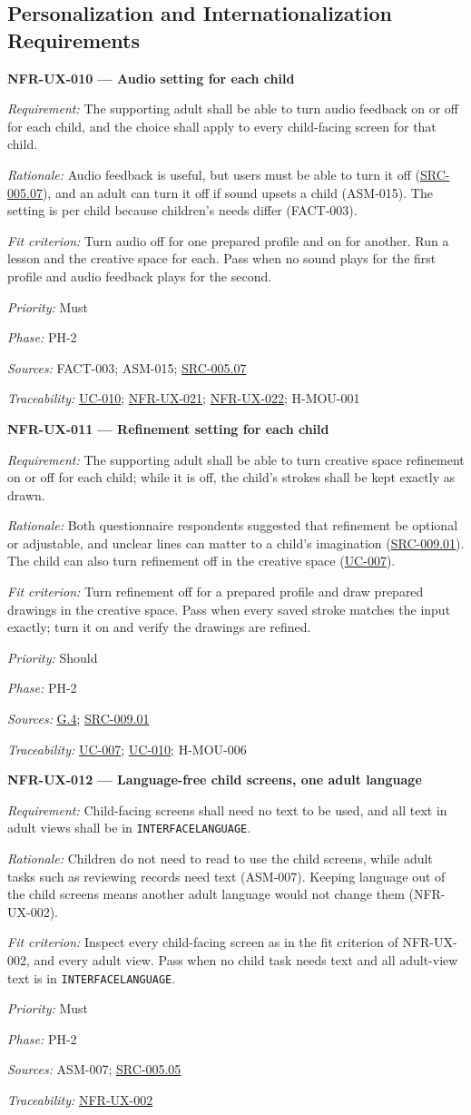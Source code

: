 \documentclass[12pt]{article}
\renewcommand{\_}{\textunderscore\allowbreak}%
\newcommand{\goalref}[1]{\hyperref[goal:#1]{G.#1}}
\newcommand{\ucref}[1]{\hyperref[uc:#1]{\mbox{UC-#1}}}
\newenvironment{srsrequirement}[2]{%
  \par\medskip\noindent\phantomsection\label{req:#1}%
  \textbf{#1 --- #2}\par\nobreak\smallskip }{\par\medskip}
\newcommand{\reqfield}[2]{\noindent\textit{#1:} #2\par}
\newcommand{\reqshall}[1]{\reqfield{Requirement}{#1}}
\newcommand{\reqrationale}[1]{\reqfield{Rationale}{#1}}
\newcommand{\reqfit}[1]{\reqfield{Fit criterion}{#1}}
\newcommand{\reqpriority}[1]{\reqfield{Priority}{#1}}
\newcommand{\reqphase}[1]{\reqfield{Phase}{#1}}
\newcommand{\reqsources}[1]{\reqfield{Sources}{#1}}
\newcommand{\reqtraces}[1]{\reqfield{Traceability}{#1}}
\newcommand{\reqref}[1]{\hyperref[req:#1]{#1}}
\newcommand{\srcref}[1]{\hyperref[src:#1]{SRC-#1}}
\providecommand{\ucref}[1]{\hyperref[uc:#1]{UC-#1}}
\begin{document}
\subsection{Personalization and Internationalization Requirements}
\label{sec:personalization}

\begin{srsrequirement}{NFR-UX-010}{Audio setting for each child}
  \reqshall{The supporting adult shall be able to turn audio feedback on or off
for each child, and the choice shall apply to every child-facing screen for that
child.} \reqrationale{Audio feedback is useful, but users must be able to turn
it off (\srcref{005.07}), and an adult can turn it off if sound upsets a child
(ASM-015). The setting is per child because children's needs differ (FACT-003).}
\reqfit{Turn audio off for one prepared profile and on for another. Run a lesson
and the creative space for each. Pass when no sound plays for the first profile
and audio feedback plays for the second.}
  \reqpriority{Must}
  \reqphase{PH-2}
  \reqsources{FACT-003; ASM-015; \srcref{005.07}} \reqtraces{\ucref{010};
  \reqref{NFR-UX-021}; \reqref{NFR-UX-022}; H-MOU-001}
\end{srsrequirement}

\begin{srsrequirement}{NFR-UX-011}{Refinement setting for each child}
  \reqshall{The supporting adult shall be able to turn creative space refinement
on or off for each child; while it is off, the child's strokes shall be kept
exactly as drawn.} \reqrationale{Both questionnaire respondents suggested that
refinement be optional or adjustable, and unclear lines can matter to a child's
imagination (\srcref{009.01}). The child can also turn refinement off in the
creative space (\ucref{007}).} \reqfit{Turn refinement off for a prepared
profile and draw prepared drawings in the creative space. Pass when every saved
stroke matches the input exactly; turn it on and verify the drawings are
refined.}
  \reqpriority{Should}
  \reqphase{PH-2}
  \reqsources{\goalref{4}; \srcref{009.01}} \reqtraces{\ucref{007}; \ucref{010};
  H-MOU-006}
\end{srsrequirement}

\begin{srsrequirement}{NFR-UX-012}{Language-free child screens, one adult
language} \reqshall{Child-facing screens shall need no text to be used, and all
text in adult views shall be in \texttt{INTERFACE\_LANGUAGE}.}
\reqrationale{Children do not need to read to use the child screens, while adult
tasks such as reviewing records need text (ASM-007). Keeping language out of the
child screens means another adult language would not change them (NFR-UX-002).}
\reqfit{Inspect every child-facing screen as in the fit criterion of NFR-UX-002,
and every adult view. Pass when no child task needs text and all adult-view text
is in \texttt{INTERFACE\_LANGUAGE}.}
  \reqpriority{Must}
  \reqphase{PH-2}
  \reqsources{ASM-007; \srcref{005.05}} \reqtraces{\reqref{NFR-UX-002}}
\end{srsrequirement}
\end{document}
